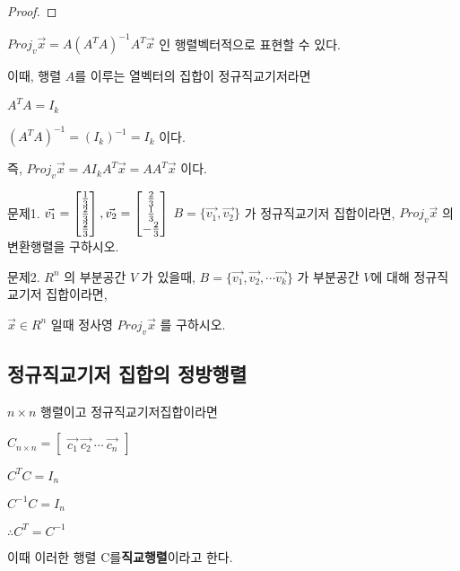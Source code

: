 \begin{proof}
\end{proof}



\begin{theorem}
$Proj_v\vec{x} = A(A^{T}A)^{-1}A^{T}\vec{x}$ 인 행렬벡터적으로 표현할 수 있다.

이때, 행렬 $A$를 이루는 열벡터의 집합이 정규직교기저라면

$A^{T}A = I_k$

$(A^{T}A)^{-1} = (I_k)^{-1} = I_k$ 이다.

즉, $Proj_v\vec{x} = AI_kA^{T}\vec{x} = AA^{T}\vec{x}$ 이다.
\end{theorem}


\newpage
문제1. $\vec{v_1} = \begin{bmatrix} {1 \over 3} \\ {2 \over 3} \\ {2 \over 3} \end{bmatrix}, \vec{v_2} = \begin{bmatrix} {2 \over 3} \\ {1 \over 3} \\ -{2 \over 3} \end{bmatrix}$ $B = \{ \vec{v_1}, \vec{v_2} \}$ 가 정규직교기저 집합이라면, $Proj_v\vec{x}$ 의 변환행렬을 구하시오.

문제2. $R^n$ 의 부분공간 $V$ 가 있을때, $B = \{ \vec{v_1},\vec{v_2}, \cdots \vec{v_k} \}$ 가 부분공간 $V$에 대해 정규직교기저 집합이라면,

$\vec{x} \in R^n$ 일때 정사영 $Proj_v\vec{x}$ 를 구하시오.
\newpage
\subsection{정규직교기저 집합의 정방행렬}
\begin{definition} 
$n \times n$ 행렬이고 정규직교기저집합이라면

$C_{n \times n} = \begin{bmatrix} \vec{c_1} \ \vec{c_2} \ \cdots \ \vec{c_n} \end{bmatrix} $

$C^{T}C = I_n $

$C^{-1}C = I_n $

$\therefore C^{T} = C^{-1}$

이때 이러한 행렬 C를\textbf{직교행렬}이라고 한다.
\end{definition}

